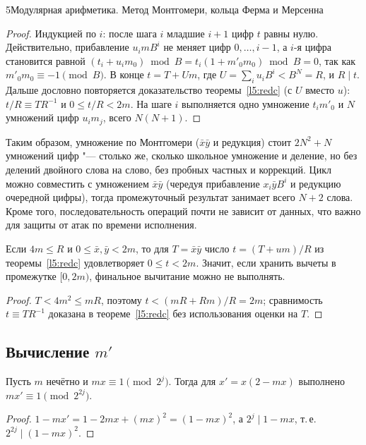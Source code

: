 \begin{lecture}{5}{Модулярная арифметика. Метод Монтгомери, кольца Ферма и Мерсенна}
\begin{proof}
Индукцией по $i$: после шага $i$ младшие $i + 1$ цифр $t$ равны нулю. Действительно,
прибавление $u_i m B^i$ не меняет цифр $0, \dots, i - 1$, а $i$-я цифра становится равной
$(t_i + u_i m_0) \bmod B = t_i(1 + m'_0 m_0) \bmod B = 0$, так как $m'_0 m_0 \equiv -1 \pmod B$.
В конце $t = T + Um$, где $U = \sum_i u_i B^i < B^N = R$, и $R \mid t$. Дальше дословно
повторяется доказательство теоремы~\ref{l5:redc} (с $U$ вместо $u$): $t/R \equiv TR^{-1}$ и
$0 \le t/R < 2m$. На шаге $i$ выполняется одно умножение $t_i m'_0$ и $N$ умножений цифр
$u_i m_j$, всего $N(N + 1)$.
\end{proof}

Таким образом, умножение по Монтгомери ($\bar x \bar y$ и редукция) стоит $2N^2 + N$ умножений
цифр "--- столько же, сколько школьное умножение и деление, но без делений двойного слова на
слово, без пробных частных и коррекций. Цикл можно совместить с умножением $\bar x \bar y$
(чередуя прибавление $x_i \bar y B^i$ и редукцию очередной цифры), тогда промежуточный
результат занимает всего $N + 2$ слова. Кроме того, последовательность операций почти не
зависит от данных, что важно для защиты от атак по времени исполнения.

\begin{proposition}\label{l5:nofinal}
Если $4m \le R$ и $0 \le \bar x, \bar y < 2m$, то для $T = \bar x \bar y$ число
$t = (T + um)/R$ из теоремы~\ref{l5:redc} удовлетворяет $0 \le t < 2m$.
Значит, если хранить вычеты в промежутке $[0, 2m)$, финальное вычитание можно не выполнять.
\end{proposition}

\begin{proof}
$T < 4m^2 \le mR$, поэтому $t < (mR + Rm)/R = 2m$; сравнимость $t \equiv TR^{-1}$ доказана в
теореме~\ref{l5:redc} без использования оценки на $T$.
\end{proof}

\subsection{Вычисление \texorpdfstring{$m'$}{m'}}

\begin{proposition}\label{l5:newton}
Пусть $m$ нечётно и $mx \equiv 1 \pmod{2^j}$. Тогда для $x' = x(2 - mx)$ выполнено
$mx' \equiv 1 \pmod{2^{2j}}$.
\end{proposition}

\begin{proof}
$1 - mx' = 1 - 2mx + (mx)^2 = (1 - mx)^2$, а $2^j \mid 1 - mx$, т.\,е. $2^{2j} \mid (1 - mx)^2$.
\end{proof}


\end{lecture}
